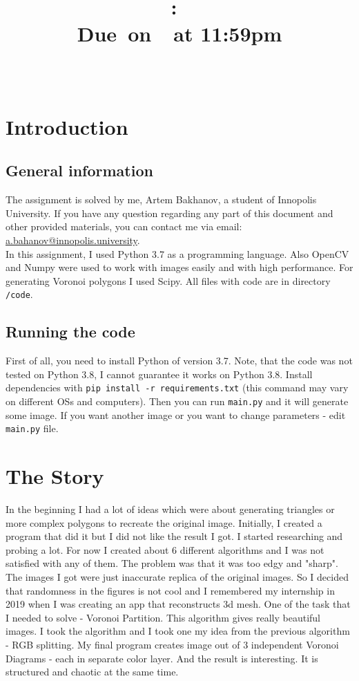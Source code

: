 \documentclass{article}
\title{
    \vspace{2in}
    \textmd{\textbf{\hmwkClass:\ \hmwkTitle}}\\
    \normalsize\vspace{0.1in}\small{Due\ on\ \hmwkDueDate\ at 11:59pm}\\
    \vspace{0.1in}\large{\textit{\hmwkClassInstructor\ }}
    \vspace{3in}
}
\author{\hmwkAuthorName}
\date{}
\begin{document}
\maketitle

\pagebreak

\tableofcontents

\pagebreak

\section{Introduction}
\subsection{General information}
    The assignment is solved by me, Artem Bakhanov, a student of Innopolis University. If you have any question regarding any part of this document and other provided materials, you can contact me via email: \href{mailto:a.bahanov@innopolis.university}{a.bahanov@innopolis.university}.\\
    In this assignment, I used Python 3.7 as a programming language. Also OpenCV and Numpy were used to work with images easily and with high performance. For generating Voronoi polygons I used Scipy. All files with code are in directory \texttt{/code}.
\subsection{Running the code}
First of all, you need to install Python of version 3.7. Note, that the code was not tested on Python 3.8, I cannot guarantee it works on Python 3.8. Install dependencies with \texttt{pip install -r requirements.txt} (this command may vary on different OSs and computers). Then you can run \texttt{main.py} and it will generate some image. If you want another image or you want to change parameters - edit \texttt{main.py} file. 

\section{The Story}
In the beginning I had a lot of ideas which were about generating triangles or more complex polygons to recreate the original image. Initially, I created a program that did it but I did not like the result I got. I started researching and probing a lot. For now I created about 6 different algorithms and I was not satisfied with any of them. The problem was that it was too edgy and "sharp". The images I got were just inaccurate replica of the original images. So I decided that randomness in the figures is not cool and I remembered my internship in 2019 when I was creating an app that reconstructs 3d mesh. One of the task that I needed to solve - Voronoi Partition. This algorithm gives really beautiful images. I took the algorithm and I took one my idea from the previous algorithm - RGB splitting. My final program creates image out of 3 independent Voronoi Diagrams - each in separate color layer. And the result is interesting. It is structured and chaotic at the same time.
\end{document}
